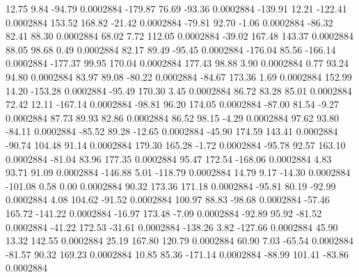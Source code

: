        12.75        9.84      -94.79     0.0002884
     -179.87       76.69      -93.36     0.0002884
     -139.91       12.21     -122.41     0.0002884
      153.52      168.82      -21.42     0.0002884
      -79.81       92.70       -1.06     0.0002884
      -86.32       82.41       88.30     0.0002884
       68.02        7.72      112.05     0.0002884
      -39.02      167.48      143.37     0.0002884
       88.05       98.68        0.49     0.0002884
       82.17       89.49      -95.45     0.0002884
     -176.04       85.56     -166.14     0.0002884
     -177.37       99.95      170.04     0.0002884
      177.43       98.88        3.90     0.0002884
        0.77       93.24       94.80     0.0002884
       83.97       89.08      -80.22     0.0002884
      -84.67      173.36        1.69     0.0002884
      152.99       14.20     -153.28     0.0002884
      -95.49      170.30        3.45     0.0002884
       86.72       83.28       85.01     0.0002884
       72.42       12.11     -167.14     0.0002884
      -98.81       96.20      174.05     0.0002884
      -87.00       81.54       -9.27     0.0002884
       87.73       89.93       82.86     0.0002884
       86.52       98.15       -4.29     0.0002884
       97.62       93.80      -84.11     0.0002884
      -85.52       89.28      -12.65     0.0002884
      -45.90      174.59      143.41     0.0002884
      -90.74      104.48       91.14     0.0002884
      179.30      165.28       -1.72     0.0002884
      -95.78       92.57      163.10     0.0002884
      -81.04       83.96      177.35     0.0002884
       95.47      172.54     -168.06     0.0002884
        4.83       93.71       91.09     0.0002884
     -146.88        5.01     -118.79     0.0002884
       14.79        9.17      -14.30     0.0002884
     -101.08        0.58        0.00     0.0002884
       90.32      173.36      171.18     0.0002884
      -95.81       80.19      -92.99     0.0002884
        4.08      104.62      -91.52     0.0002884
      100.97       88.83      -98.68     0.0002884
      -57.46      165.72     -141.22     0.0002884
      -16.97      173.48       -7.09     0.0002884
      -92.89       95.92      -81.52     0.0002884
      -41.22      172.53      -31.61     0.0002884
     -138.26        3.82     -127.66     0.0002884
       45.90       13.32      142.55     0.0002884
       25.19      167.80      120.79     0.0002884
       60.90        7.03      -65.54     0.0002884
      -81.57       90.32      169.23     0.0002884
       10.85       85.36     -171.14     0.0002884
      -88.99      101.41      -83.86     0.0002884
